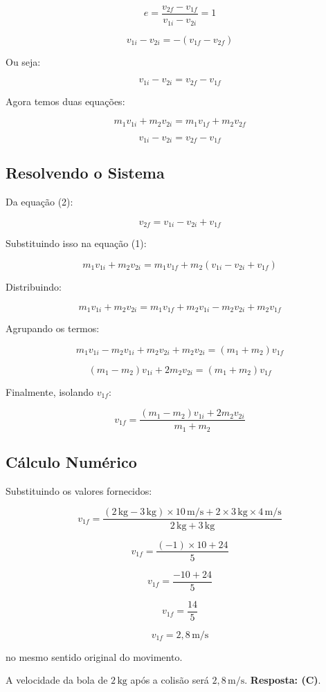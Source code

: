 \documentclass[a4paper,12pt]{article}
\begin{document}
\begin{flushleft}
\[
e = \frac{v_{2f} - v_{1f}}{v_{1i} - v_{2i}} = 1
\]

\[
v_{1i} - v_{2i} = -(v_{1f} - v_{2f})
\]

Ou seja:

\[
v_{1i} - v_{2i} = v_{2f} - v_{1f}
\]

Agora temos duas equações:

\begin{equation}
m_1v_{1i} + m_2v_{2i} = m_1v_{1f} + m_2v_{2f} \tag{1}
\end{equation}

\begin{equation}
v_{1i} - v_{2i} = v_{2f} - v_{1f} \tag{2}
\end{equation}

\subsection*{Resolvendo o Sistema}

Da equação (2):

\[
\boxed{
v_{2f} = v_{1i} - v_{2i} + v_{1f}
}
\]

Substituindo isso na equação (1):

\[
m_1v_{1i} + m_2v_{2i} = m_1v_{1f} + m_2(v_{1i} - v_{2i} + v_{1f})
\]

Distribuindo:

\[
m_1v_{1i} + m_2v_{2i} = m_1v_{1f} + m_2v_{1i} - m_2v_{2i} + m_2v_{1f}
\]

Agrupando os termos:

\[
m_1v_{1i} - m_2v_{1i} + m_2v_{2i} + m_2v_{2i} = (m_1 + m_2)v_{1f}
\]

\[
(m_1 - m_2)v_{1i} + 2m_2v_{2i} = (m_1 + m_2)v_{1f}
\]

Finalmente, isolando \(v_{1f}\):

\[
\boxed{
v_{1f} = \frac{(m_1 - m_2)v_{1i} + 2m_2v_{2i}}{m_1 + m_2}
}
\]

\subsection*{Cálculo Numérico}

Substituindo os valores fornecidos:

\[
v_{1f} = \frac{(2\,\text{kg} - 3\,\text{kg}) \times 10\,\text{m/s} + 2 \times 3\,\text{kg} \times 4\,\text{m/s}}{2\,\text{kg} + 3\,\text{kg}}
\]

\[
v_{1f} = \frac{(-1)\times10 + 24}{5}
\]

\[
v_{1f} = \frac{-10 + 24}{5}
\]

\[
v_{1f} = \frac{14}{5}
\]

\[
\boxed{v_{1f} = 2{,}8\,\text{m/s}}
\]

no mesmo sentido original do movimento.

A velocidade da bola de \(2\,\text{kg}\) após a colisão será \(2{,}8\,\text{m/s}\). \textbf{Resposta: \colorbox{green!50}{(C)}}. 

\end{flushleft}
\end{document}

